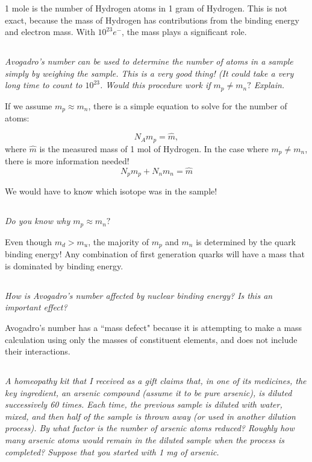 \documentclass[12pt, letterpaper]{article}
\begin{document}
1 mole is the number of Hydrogen atoms in 1 gram of Hydrogen. This is not exact, because the mass of Hydrogen has contributions from the binding energy and electron mass. With $10^{23} e^-$, the mass plays a significant role.

\subsection{}
\textit{Avogadro's number can be used to determine the number of atoms in a sample simply by weighing the sample. This is a very good thing! (It could take a very long time to count to $10^{23}$. Would this procedure work if $m_{p} \neq m_{n} ?$ Explain.}

If we assume $m_p \approx m_n$, there is a simple equation to solve for the number of atoms:

$$
N_A m_p = \hat m,
$$
where $\hat m$ is the measured mass of 1 mol of Hydrogen. In the case where $m_p \neq m_n$, there is more information needed!
$$
N_{p} m_{p}+N_{n} m_{n}=\hat{m}
$$

We would have to know which isotope was in the sample!


\subsection{}
\textit{Do you know why $m_{p} \approx m_{n} ?$}

Even though $m_d > m_u$, the majority of $m_p$ and $m_n$ is determined by the quark binding energy! Any combination of first generation quarks will have a mass that is dominated by binding energy. 

\subsection{}
\textit{How is Avogadro's number affected by nuclear binding energy? Is this an important effect?}

Avogadro's number has a ``mass defect" because it is attempting to make a mass calculation using only the masses of constituent elements, and does not include their interactions. 

\subsection{}
\textit{A homeopathy kit that I received as a gift claims that, in one of its medicines, the key ingredient, an arsenic compound (assume it to be pure arsenic), is diluted successively 60 times. Each time, the previous sample is diluted with water, mixed, and then half of the sample is thrown away (or used in another dilution process). By what factor is the number of arsenic atoms reduced? Roughly how many arsenic atoms would remain in the diluted sample when the process is completed? Suppose that you started with 1 mg of arsenic.}
\end{document}
